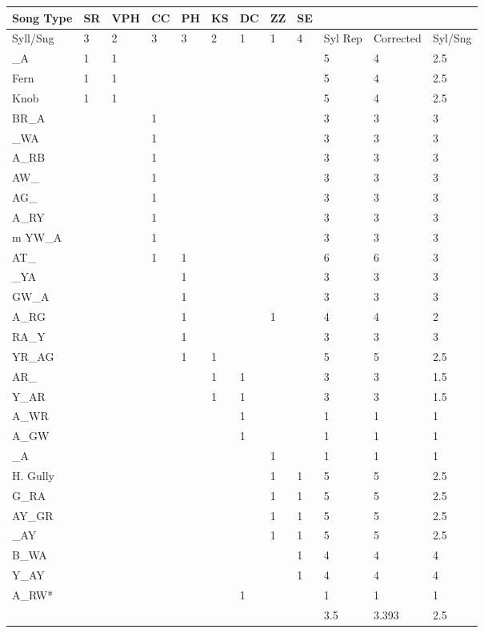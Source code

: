\documentclass[a4paper,12pt]{article}
\begin{document}
\begin{table}[ht]
\begin{tabular}{|l|llllllll|lll|}
  \hline
Song Type & SR & VPH & CC & PH & KS & DC & ZZ & SE &  &  &  \\ 
  \hline
Syll/Sng & 3 & 2 & 3 & 3 & 2 & 1 & 1 & 4 & Syl Rep & Corrected & Syl/Sng \\ 
\hline
\hline
  \_A & 1 & 1 &  &  &  &  &  &  & 5 & 4 & 2.5 \\ 
  Fern & 1 & 1 &  &  &  &  &  &  & 5 & 4 & 2.5 \\ 
  Knob & 1 & 1 &  &  &  &  &  &  & 5 & 4 & 2.5 \\ 
  BR\_A &  &  & 1 &  &  &  &  &  & 3 & 3 & 3 \\ 
  \_WA &  &  & 1 &  &  &  &  &  & 3 & 3 & 3 \\ 
  A\_RB &  &  & 1 &  &  &  &  &  & 3 & 3 & 3 \\ 
  AW\_ &  &  & 1 &  &  &  &  &  & 3 & 3 & 3 \\ 
  AG\_ &  &  & 1 &  &  &  &  &  & 3 & 3 & 3 \\ 
  A\_RY &  &  & 1 &  &  &  &  &  & 3 & 3 & 3 \\ 
  m YW\_A &  &  & 1 &  &  &  &  &  & 3 & 3 & 3 \\ 
  AT\_ &  &  & 1 & 1 &  &  &  &  & 6 & 6 & 3 \\ 
  \_YA &  &  &  & 1 &  &  &  &  & 3 & 3 & 3 \\ 
  GW\_A &  &  &  & 1 &  &  &  &  & 3 & 3 & 3 \\ 
  A\_RG &  &  &  & 1 &  &  & 1 &  & 4 & 4 & 2 \\ 
  RA\_Y &  &  &  & 1 &  &  &  &  & 3 & 3 & 3 \\ 
  YR\_AG &  &  &  & 1 & 1 &  &  &  & 5 & 5 & 2.5 \\ 
  AR\_ &  &  &  &  & 1 & 1 &  &  & 3 & 3 & 1.5 \\ 
  Y\_AR &  &  &  &  & 1 & 1 &  &  & 3 & 3 & 1.5 \\ 
  A\_WR &  &  &  &  &  & 1 &  &  & 1 & 1 & 1 \\ 
  A\_GW &  &  &  &  &  & 1 &  &  & 1 & 1 & 1 \\ 
  \_A &  &  &  &  &  &  & 1 &  & 1 & 1 & 1 \\ 
  H. Gully &  &  &  &  &  &  & 1 & 1 & 5 & 5 & 2.5 \\ 
  G\_RA &  &  &  &  &  &  & 1 & 1 & 5 & 5 & 2.5 \\ 
  AY\_GR &  &  &  &  &  &  & 1 & 1 & 5 & 5 & 2.5 \\ 
  \_AY &  &  &  &  &  &  & 1 & 1 & 5 & 5 & 2.5 \\ 
  B\_WA &  &  &  &  &  &  &  & 1 & 4 & 4 & 4 \\ 
  Y\_AY &  &  &  &  &  &  &  & 1 & 4 & 4 & 4 \\ 
  A\_RW* &  &  &  &  &  & 1 &  &  & 1 & 1 & 1 \\ 
  \hline
   &  &  &  &  &  &  &  & & 3.5 & 3.393 & 2.5 \\ 
   \hline
\end{tabular}
\end{table}
\end{document}
